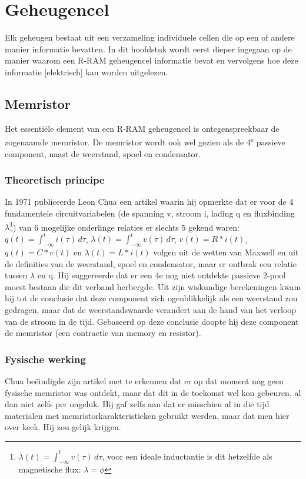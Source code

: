 \chapter{Geheugencel}
\label{cell}
Elk geheugen bestaat uit een verzameling individuele cellen die op een of andere manier informatie bevatten.
In dit hoofdstuk wordt eerst dieper ingegaan op de manier waarom een R-RAM geheugencel informatie bevat en vervolgens hoe deze informatie [elektrisch] kan worden uitgelezen.

\section{Memristor}
Het essentiële element van een R-RAM geheugencel is ontegenspreekbaar de zogenaamde memristor.
De memristor wordt ook wel gezien als de 4\textsuperscript{e} passieve component, naast de weerstand, spoel en condensator.

\subsection{Theoretisch principe}
In 1971 publiceerde Leon Chua een artikel waarin hij opmerkte dat er voor de 4 fundamentele circuitvariabelen (de spanning v, stroom i, lading q en fluxbinding $\lambda$\footnote{$\lambda(t) =  \int^{t}_{-\infty} v(\tau) \, d\tau $, voor een ideale inductantie is dit hetzelfde als magnetische flux: $\lambda = \phi$ }) van 6 mogelijke onderlinge relaties er slechts 5 gekend waren: $q(t) =  \int^{t}_{-\infty} i(\tau) \, d\tau $, $\lambda(t) =  \int^{t}_{-\infty} v(\tau) \, d\tau $, $v(t)=R*i(t)$, $q(t)=C*v(t)$ en $\lambda(t) = L*i(t)$ volgen uit de wetten van Maxwell en uit de definities van de weerstand, spoel en condensator, maar er ontbrak een relatie tussen $\lambda$ en q.\cite{Chu71} Hij suggereerde dat er een 4e nog niet ontdekte passieve 2-pool moest bestaan die dit verband herbergde.
Uit zijn wiskundige berekeningen kwam hij tot de conclusie dat deze component zich ogenblikkelijk als een weerstand zou gedragen, maar dat de weerstandswaarde verandert aan de hand van het verloop van de stroom in de tijd. Gebaseerd op deze conclusie doopte hij deze component de memristor (een contractie van memory en resistor).

\subsection{Fysische werking}
Chua beëindigde zijn artikel met te erkennen dat er op dat moment nog geen fysische memristor was ontdekt, maar dat dit in de toekomst wel kon gebeuren, al dan niet zelfs per ongeluk. Hij gaf zelfs aan dat er misschien al in die tijd materialen met memristorkarakteristieken gebruikt werden, maar dat men hier over keek. Hij zou gelijk krijgen.


